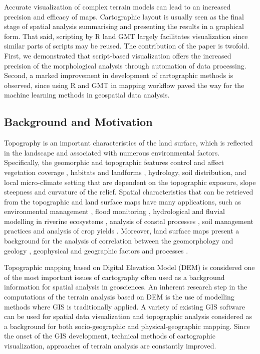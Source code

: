 \documentclass[land,article,submit,pdftex,moreauthors]{Definitions/mdpi}
\begin{document}
Accurate visualization of complex terrain models can lead to an increased precision and efficacy of maps. Cartographic layout is usually seen as the final stage of spatial analysis summarising and presenting the results in a graphical form. That said, scripting by R land GMT largely facilitates visualization since similar parts of scripts may be reused. The contribution of the paper is twofold. First, we demonstrated that script-based visualization offers the increased precision of the morphological analysis through automation of data processing. Second, a marked improvement in development of cartographic methods is observed, since using R and GMT in mapping workflow paved the way for the machine learning methods in geospatial data analysis.

\subsection{Background and Motivation}
Topography is an important characteristics of the land surface, which is reflected in the landscape and associated with numerous environmental factors. Specifically, the geomorphic and topographic features control and affect vegetation coverage \cite{land10060559,GOMEZ201511}, habitats and landforms \cite{land7030102,land10101031}, hydrology, soil distribution, and local micro-climate setting that are dependent on the topographic exposure, slope steepness and curvature of the relief. Spatial characteristics that can be retrieved from the topographic and land surface maps have many applications, such as environmental management  \cite{land6040083}, flood monitoring \cite{HOOKE2020106793}, hydrological and fluvial modelling in riverine ecosystems \cite{SIAKEU2004231,NAKAYAMA201362}, analysis of coastal processes \cite{ITO2022102527}, soil management practices and analysis of crop yields \cite{TABUCHI20174,PRIYA2001113,SASAI2012175}. Moreover, land surface maps present a background for the analysis of correlation between the geomorphology and geology \cite{MATSUURA20141}, geophysical and geographic factors and processes \cite{IMAIZUMI2018125}. 

Topographic mapping based on Digital Elevation Model (DEM) is considered one of the most important issues of cartography often used as a background information for spatial analysis in geosciences. An inherent research step in the computations of the terrain analysis based on DEM is the use of modelling methods where GIS is traditionally applied. A variety of existing GIS software can be used for spatial data visualization and topographic analysis considered as a background for both socio-geographic and physical-geographic mapping. Since the onset of the GIS development, technical methods of cartographic visualization, approaches of terrain analysis are constantly improved.
\end{document}
